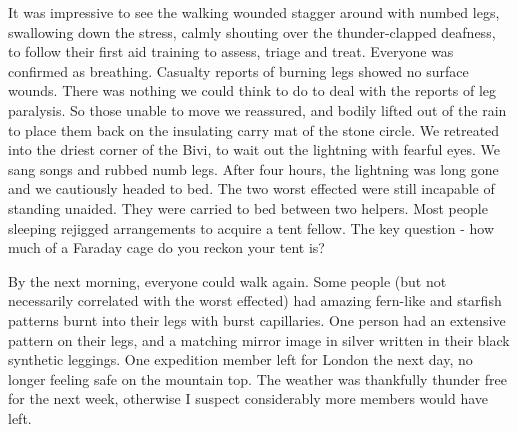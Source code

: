 It was impressive to see the walking wounded stagger around with numbed legs, swallowing down the stress, calmly shouting over the thunder-clapped deafness, to follow their first aid training to assess, triage and treat. Everyone was confirmed as breathing. Casualty reports of burning legs showed no surface wounds. There was nothing we could think to do to deal with the reports of leg paralysis. So those unable to move we reassured, and bodily lifted out of the rain to place them back on the insulating carry mat of the stone circle. We retreated into the driest corner of the Bivi, to wait out the lightning with fearful eyes. We sang songs and rubbed numb legs. After four hours, the lightning was long gone and we cautiously headed to bed. The two worst effected were still incapable of standing unaided. They were carried to bed between two helpers. Most people sleeping rejigged arrangements to acquire a tent fellow. The key question - how much of a Faraday cage do you reckon your tent is?


By the next morning, everyone could walk again. Some people (but not necessarily correlated with the worst effected) had amazing fern-like and starfish patterns burnt into their legs with burst capillaries. One person had an extensive pattern on their legs, and a matching mirror image in silver written in their black synthetic leggings. One expedition member left for London the next day, no longer feeling safe on the mountain top. The weather was thankfully thunder free for the next week, otherwise I suspect considerably more members would have left. 

